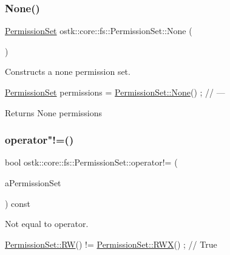\subsubsection{\texorpdfstring{None()}{None()}}
{\footnotesize\ttfamily \hyperlink{classostk_1_1core_1_1fs_1_1_permission_set}{Permission\+Set} ostk\+::core\+::fs\+::\+Permission\+Set\+::\+None (\begin{DoxyParamCaption}{ }\end{DoxyParamCaption})\hspace{0.3cm}{\ttfamily [static]}}



Constructs a none permission set. 


\begin{DoxyCode}
\hyperlink{classostk_1_1core_1_1fs_1_1_permission_set_a31c918014e874ceac487e92d0d3ac5a2}{PermissionSet} permissions = \hyperlink{classostk_1_1core_1_1fs_1_1_permission_set_a32af3f0195b5ec761282521823edc12e}{PermissionSet::None}() ; \textcolor{comment}{// ---}
\end{DoxyCode}


\begin{DoxyReturn}{Returns}
None permissions 
\end{DoxyReturn}
\mbox{\label{classostk_1_1core_1_1fs_1_1_permission_set_a052ee5b7da22d8b7485ac81a13ed4136}} 
\subsubsection{\texorpdfstring{operator"!=()}{operator!=()}}
{\footnotesize\ttfamily bool ostk\+::core\+::fs\+::\+Permission\+Set\+::operator!= (\begin{DoxyParamCaption}\item[{const \hyperlink{classostk_1_1core_1_1fs_1_1_permission_set}{Permission\+Set} \&}]{a\+Permission\+Set }\end{DoxyParamCaption}) const}



Not equal to operator. 


\begin{DoxyCode}
\hyperlink{classostk_1_1core_1_1fs_1_1_permission_set_ad58bc0911ca89d3c03c089f1647d0315}{PermissionSet::RW}() != \hyperlink{classostk_1_1core_1_1fs_1_1_permission_set_a9298592527e35edb785430f03e83e79f}{PermissionSet::RWX}() ; \textcolor{comment}{// True}
\end{DoxyCode}



